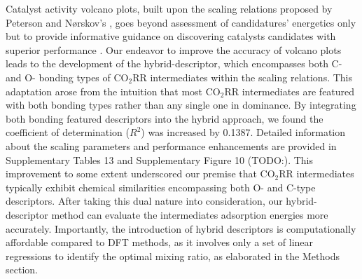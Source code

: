 Catalyst activity volcano plots, built upon the scaling relations proposed by Peterson and Nørskov's \cite{peterson2012activity},
goes beyond assessment of candidatures' energetics only but to provide informative guidance on discovering catalysts candidates with superior performance \cite{balandin1969modern, deutschmann2000heterogeneous}.
Our endeavor to improve the accuracy of volcano plots leads to the development of the hybrid-descriptor,
which encompasses both C- and O- bonding types of CO$_2$RR intermediates within the scaling relations.
This adaptation arose from the intuition that most CO$_2$RR intermediates are featured with both bonding types rather than any single one in dominance.
By integrating both bonding featured descriptors into the hybrid approach, we found the coefficient of determination ($R^2$) was increased by 0.1387.
Detailed information about the scaling parameters and performance enhancements are provided in Supplementary Tables 13 and Supplementary Figure 10 (TODO:).
This improvement to some extent underscored our premise that CO$_2$RR intermediates typically exhibit chemical similarities encompassing both O- and C-type descriptors.
After taking this dual nature into consideration, our hybrid-descriptor method can evaluate the intermediates adsorption energies more accurately.
Importantly, the introduction of hybrid descriptors is computationally affordable compared to DFT methods,
as it involves only a set of linear regressions to identify the optimal mixing ratio, as elaborated in the Methods section.

